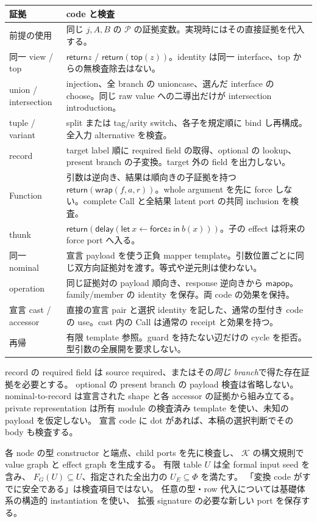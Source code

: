 \documentclass[11pt,a4paper]{article}
\newcommand{\Ret}{\mathsf{return}}
\newcommand{\Delay}{\mathsf{delay}}
\newcommand{\Force}{\mathsf{force}}
\newcommand{\Wrap}{\mathsf{wrap}}
\newcommand{\Core}{\mathcal K}
\begin{document}
\begin{longtable}{p{}p{}}
\toprule 証拠 & code と検査 \\
\midrule\endhead
前提の使用 & 同じ $j,A,B$ の $\mathcal P$ の証拠変数。実現時にはその直接証拠を代入する。\\
同一 view / top & \(\Ret z\) / \(\Ret(\mathsf{top}(z))\)。identity は同一 interface、top からの無検査除去はない。\\
union / intersection & injection、全 branch の unioncase、選んだ interface の choose。同じ raw value への二導出だけが intersection introduction。\\
tuple / variant & split または tag/arity switch、各子を規定順に bind し再構成。全入力 alternative を検査。\\
record & target label 順に required field の取得、optional の lookup、present branch の子変換。target 外の field を出力しない。\\
Function & 引数は逆向き、結果は順向きの子証拠を持つ \(\Ret(\Wrap(f,a,r))\)。whole argument を先に force しない。complete Call と全結果 latent port の共同 inclusion を検査。\\
thunk & \(\Ret(\Delay(\mathsf{let}\ x\leftarrow\Force z\ \mathsf{in}\ b(x)))\)。子の effect は将来の force port へ入る。\\
同一 nominal & 宣言 payload を使う正負 mapper template。引数位置ごとに同じ双方向証拠対を渡す。等式や逆元則は使わない。\\
operation & 同じ証拠対の payload 順向き、response 逆向きから \(\mathsf{mapop}\)。family/member の identity を保存。両 code の効果を保持。\\
宣言 cast / accessor & 直接の宣言 pair と選択 identity を記した、通常の型付き code の use。cast 内の Call は通常の receipt と効果を持つ。\\
再帰 & 有限 template 参照。guard を持たない辺だけの cycle を拒否。型引数の全展開を要求しない。\\
\bottomrule
\end{longtable}

record の required field は source required、またはその\emph{同じ branch}で得た存在証拠を必要とする。
optional の present branch の payload 検査は省略しない。
nominal-to-record は宣言された shape と各 accessor の証拠から組み立てる。
private representation は所有 module の検査済み template を使い、未知の payload を仮定しない。
宣言 code に dot があれば、本稿の選択判断でその body も検査する。

各 node の型 constructor と端点、child ports を先に検査し、
\(\Core\) の構文規則で value graph と effect graph を生成する。
有限 table \(U\) は全 formal input seed を含み、
\(F_G(U)\subseteq U\)、指定された全出力の \(U_E\subseteq\Phi\) を満たす。
「変換 code がすでに安全である」は検査項目ではない。
任意の型・row 代入については基礎体系の構造的 instantiation を使い、
拡張 signature の必要な新しい port を保存する。
\end{document}
